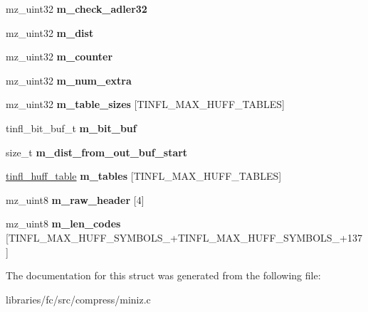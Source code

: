 \begin{DoxyCompactItemize}
mz\+\_\+uint32 {\bfseries m\+\_\+check\+\_\+adler32}
\item 
\mbox{\label{structtinfl__decompressor__tag_ad0221a26f3135d362943de2e2806aa12}} 
mz\+\_\+uint32 {\bfseries m\+\_\+dist}
\item 
\mbox{\label{structtinfl__decompressor__tag_a55d43ca0603c01e6b40945c901e1343e}} 
mz\+\_\+uint32 {\bfseries m\+\_\+counter}
\item 
\mbox{\label{structtinfl__decompressor__tag_af646c16845f58dd81ee8dc03e0fc2a43}} 
mz\+\_\+uint32 {\bfseries m\+\_\+num\+\_\+extra}
\item 
\mbox{\label{structtinfl__decompressor__tag_ac592ab5540fb0bd0ae64867ed50402b2}} 
mz\+\_\+uint32 {\bfseries m\+\_\+table\+\_\+sizes} \mbox{[}T\+I\+N\+F\+L\+\_\+\+M\+A\+X\+\_\+\+H\+U\+F\+F\+\_\+\+T\+A\+B\+L\+ES\mbox{]}
\item 
\mbox{\label{structtinfl__decompressor__tag_a534e77162cb88e3d5b2ca52378860e04}} 
tinfl\+\_\+bit\+\_\+buf\+\_\+t {\bfseries m\+\_\+bit\+\_\+buf}
\item 
\mbox{\label{structtinfl__decompressor__tag_a7f3575865115ab117d1d16afd5c173d9}} 
size\+\_\+t {\bfseries m\+\_\+dist\+\_\+from\+\_\+out\+\_\+buf\+\_\+start}
\item 
\mbox{\label{structtinfl__decompressor__tag_a98139fb01bb5d503cb24acbd23af33a1}} 
\mbox{\hyperlink{structtinfl__huff__table}{tinfl\+\_\+huff\+\_\+table}} {\bfseries m\+\_\+tables} \mbox{[}T\+I\+N\+F\+L\+\_\+\+M\+A\+X\+\_\+\+H\+U\+F\+F\+\_\+\+T\+A\+B\+L\+ES\mbox{]}
\item 
\mbox{\label{structtinfl__decompressor__tag_a9e1f3aec5562c9b6fe92d96ad70b6d29}} 
mz\+\_\+uint8 {\bfseries m\+\_\+raw\+\_\+header} \mbox{[}4\mbox{]}
\item 
\mbox{\label{structtinfl__decompressor__tag_adb33b4be77767c95e8b1816567583ba1}} 
mz\+\_\+uint8 {\bfseries m\+\_\+len\+\_\+codes} \mbox{[}T\+I\+N\+F\+L\+\_\+\+M\+A\+X\+\_\+\+H\+U\+F\+F\+\_\+\+S\+Y\+M\+B\+O\+L\+S\+\_+T\+I\+N\+F\+L\+\_\+\+M\+A\+X\+\_\+\+H\+U\+F\+F\+\_\+\+S\+Y\+M\+B\+O\+L\+S\+\_+137\mbox{]}
\end{DoxyCompactItemize}


The documentation for this struct was generated from the following file\+:\begin{DoxyCompactItemize}
\item 
libraries/fc/src/compress/miniz.\+c\end{DoxyCompactItemize}
